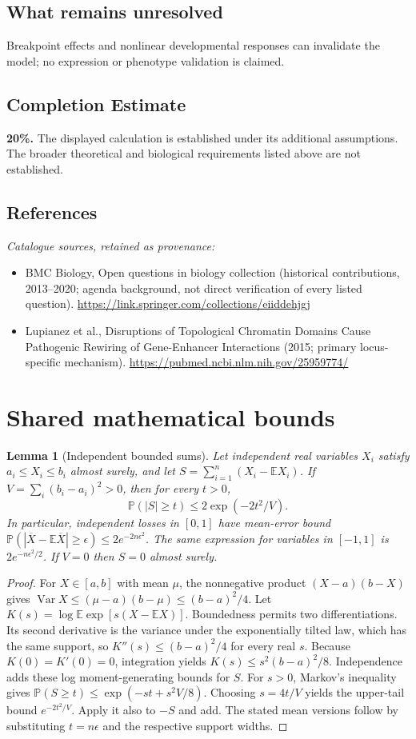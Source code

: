 \documentclass[11pt]{article}
\newcommand{\E}{\mathbb E}
\newcommand{\Prob}{\mathbb P}
\DeclareMathOperator{\Var}{Var}
\providecommand{\E}{\mathbb E}
\providecommand{\Prob}{\mathbb P}
\providecommand{\Var}{\operatorname{Var}}
\newtheorem{sharedlemma}{Lemma}[section]
\begin{document}
\subsection{What remains unresolved}
Breakpoint effects and nonlinear developmental responses can invalidate the model; no expression or phenotype validation is claimed.
\subsection{Completion Estimate}
\textbf{20\%.} The displayed calculation is established under its additional assumptions. The broader theoretical and biological requirements listed above are not established.
\subsection{References}
\noindent\emph{Catalogue sources, retained as provenance:}
\begin{itemize}
\item BMC Biology, Open questions in biology collection (historical contributions, 2013--2020; agenda background, not direct verification of every listed question). \url{https://link.springer.com/collections/eiiddehjgj}
\item Lupianez et al., Disruptions of Topological Chromatin Domains Cause Pathogenic Rewiring of Gene-Enhancer Interactions (2015; primary locus-specific mechanism). \url{https://pubmed.ncbi.nlm.nih.gov/25959774/}
\end{itemize}
\clearpage


\appendix
\section{Shared mathematical bounds}\label{app:bounds}
\begin{sharedlemma}[Independent bounded sums]\label{lem:bounded}
Let independent real variables $X_i$ satisfy $a_i\leq X_i\leq b_i$ almost surely,
and let $S=\sum_{i=1}^n(X_i-\E X_i)$. If
$V=\sum_i(b_i-a_i)^2>0$, then for every $t>0$,
\[
 \Prob(|S|\geq t)\leq 2\exp(-2t^2/V).
\]
In particular, independent losses in $[0,1]$ have mean-error bound
$\Prob(|\overline X-\E\overline X|\geq\epsilon)
\leq2e^{-2n\epsilon^2}$. The same expression for variables in $[-1,1]$
is $2e^{-n\epsilon^2/2}$. If $V=0$ then $S=0$ almost surely.
\end{sharedlemma}
\begin{proof}
For $X\in[a,b]$ with mean $\mu$, the nonnegative product
$(X-a)(b-X)$ gives
$\Var X\leq(\mu-a)(b-\mu)\leq(b-a)^2/4$.
Let $K(s)=\log\E\exp[s(X-\E X)]$.
Boundedness permits two differentiations. Its second derivative is the variance
under the exponentially tilted law, which has the same support, so
$K''(s)\leq(b-a)^2/4$ for every real $s$.
Because $K(0)=K'(0)=0$, integration yields
$K(s)\leq s^2(b-a)^2/8$.
Independence adds these log moment-generating bounds for $S$.
For $s>0$, Markov's inequality gives
$\Prob(S\geq t)\leq\exp(-st+s^2V/8)$.
Choosing $s=4t/V$ yields the upper-tail bound $e^{-2t^2/V}$.
Apply it also to $-S$ and add. The stated mean versions follow by substituting
$t=n\epsilon$ and the respective support widths.
\end{proof}
\end{document}
